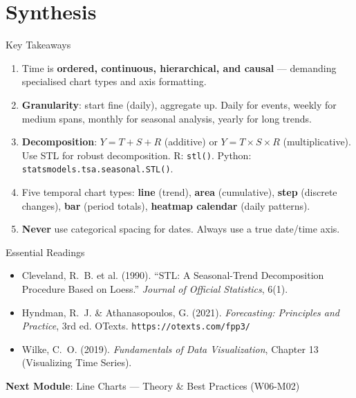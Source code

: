 \documentclass[10pt]{beamer}
\begin{document}
\section{Synthesis}

\begin{frame}{Key Takeaways}
  \begin{enumerate}
    \item Time is \textbf{ordered, continuous, hierarchical, and causal}
          --- demanding specialised chart types and axis formatting.
    \item \textbf{Granularity}: start fine (daily), aggregate up.
          Daily for events, weekly for medium spans, monthly for
          seasonal analysis, yearly for long trends.
    \item \textbf{Decomposition}: $Y = T + S + R$ (additive) or
          $Y = T \times S \times R$ (multiplicative). Use STL for
          robust decomposition. R: \texttt{stl()}. Python:
          \texttt{statsmodels.tsa.seasonal.STL()}.
    \item Five temporal chart types: \textbf{line} (trend), \textbf{area}
          (cumulative), \textbf{step} (discrete changes), \textbf{bar}
          (period totals), \textbf{heatmap calendar} (daily patterns).
    \item \textbf{Never} use categorical spacing for dates. Always
          use a true date/time axis.
  \end{enumerate}
\end{frame}

\begin{frame}{Essential Readings}
  \begin{itemize}
    \item Cleveland, R.~B. et al. (1990). ``STL: A Seasonal-Trend
          Decomposition Procedure Based on Loess.'' \emph{Journal
          of Official Statistics}, 6(1).
    \item Hyndman, R.~J. \& Athanasopoulos, G. (2021). \emph{Forecasting:
          Principles and Practice}, 3rd ed. OTexts.
          \texttt{https://otexts.com/fpp3/}
    \item Wilke, C.~O. (2019). \emph{Fundamentals of Data Visualization},
          Chapter 13 (Visualizing Time Series).
  \end{itemize}
  \vspace{6pt}
  \textbf{Next Module}: Line Charts --- Theory \& Best Practices (W06-M02)
\end{frame}
\end{document}

